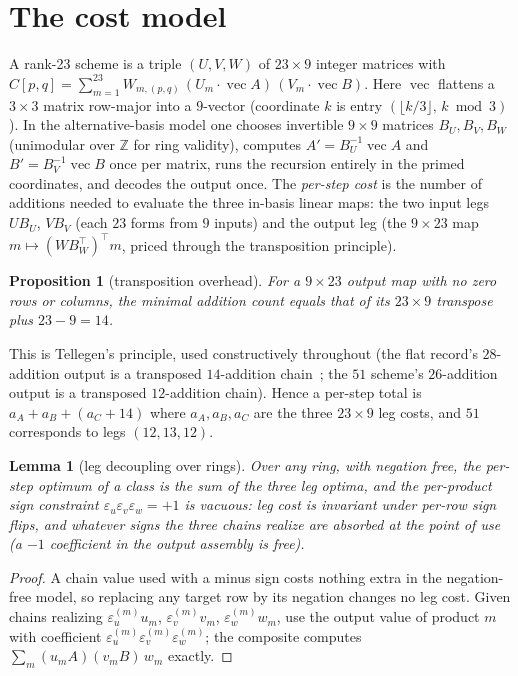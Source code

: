 \documentclass[11pt]{article}
\newtheorem{lemma}[theorem]{Lemma}
\newtheorem{proposition}[theorem]{Proposition}
\theoremstyle{definition}
\theoremstyle{remark}
\newcommand{\Z}{\mathbb{Z}}
\newcommand{\eps}{\varepsilon}
\begin{document}
\section{The cost model}\label{sec:model}

A rank-23 scheme is a triple $(U,V,W)$ of $23\times9$ integer
matrices with
$C[p,q]=\sum_{m=1}^{23} W_{m,(p,q)}\,(U_m\!\cdot\!\operatorname{vec}A)\,
(V_m\!\cdot\!\operatorname{vec}B)$.
Here $\operatorname{vec}$ flattens a $3\times3$ matrix row-major
into a $9$-vector (coordinate $k$ is entry
$(\lfloor k/3\rfloor,\,k\bmod 3)$).
In the alternative-basis model one chooses invertible $9\times9$
matrices $B_U,B_V,B_W$ (unimodular over $\Z$ for ring validity),
computes $A'=B_U^{-1}\operatorname{vec}A$ and
$B'=B_V^{-1}\operatorname{vec}B$ once per matrix, runs the recursion
entirely in the primed coordinates, and decodes the output once.  The
\emph{per-step cost} is the number of additions needed to evaluate the
three in-basis linear maps: the two input legs $U\!B_U$, $V\!B_V$
(each $23$ forms from $9$ inputs) and the output leg (the $9\times23$
map $m\mapsto (WB_W^{\!\top})^{\!\top} m$, priced through the
transposition principle).

\begin{proposition}[transposition overhead]\label{prop:tellegen}
For a $9\times23$ output map with no zero rows or columns, the minimal
addition count equals that of its $23\times9$ transpose plus
$23-9=14$.
\end{proposition}

This is Tellegen's principle, used constructively throughout (the
flat record's $28$-addition output is a transposed $14$-addition
chain~\cite{Sidebottom26,KI26}; the $51$ scheme's $26$-addition output
is a transposed $12$-addition chain).  Hence a per-step total is
$a_A+a_B+(a_C+14)$ where $a_A,a_B,a_C$ are the three $23\times9$ leg
costs, and $51$ corresponds to legs $(12,13,12)$.

\begin{lemma}[leg decoupling over rings]\label{lem:decouple}
Over any ring, with negation free, the per-step optimum of a class is
the sum of the three leg optima, and the per-product sign constraint
$\eps_u\eps_v\eps_w=+1$ is vacuous: leg cost is invariant under
per-row sign flips, and whatever signs the three chains realize are
absorbed at the point of use (a $-1$ coefficient in the output
assembly is free).
\end{lemma}

\begin{proof}
A chain value used with a minus sign costs nothing extra in the
negation-free model, so replacing any target row by its negation
changes no leg cost.  Given chains realizing
$\eps_u^{(m)}u_m$, $\eps_v^{(m)}v_m$, $\eps_w^{(m)}w_m$, use the output
value of product $m$ with coefficient
$\eps_u^{(m)}\eps_v^{(m)}\eps_w^{(m)}$; the composite computes
$\sum_m (u_m A)(v_m B)\,w_m$ exactly.
\end{proof}
\end{document}
